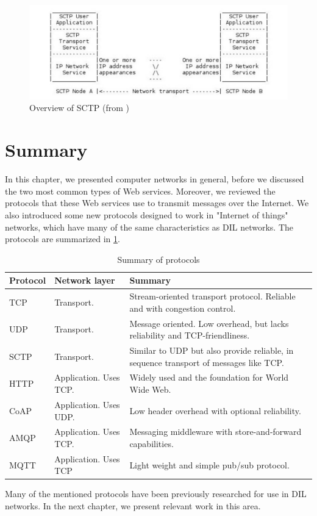 \begin{figure}[h]
\includegraphics[scale=0.5]{images/sctp.pdf}
\caption{Overview of SCTP (from \cite{rfc-sctp})}
\end{figure}



\section{Summary}

In this chapter, we presented computer networks in general, before we discussed
the two most common types of Web services. Moreover, we reviewed the protocols
that these Web services use to transmit messages over the Internet. We also
introduced some new protocols designed to work in "Internet of things" networks,
which have many of the same characteristics as DIL networks. The protocols are
summarized in \cref{table:protocols:summary}.

\begin{table}[h]
\begin{tabularx}{\textwidth}{| l | l | X |}
\hline
  \textbf{Protocol} & \textbf{Network layer} & \textbf{Summary} \\ \hline
  TCP & Transport. & Stream-oriented transport protocol. Reliable and with congestion control. \\ \hline
  UDP & Transport. & Message oriented. Low overhead, but lacks reliability and TCP-friendliness. \\ \hline
  SCTP & Transport. & Similar to UDP but also provide reliable, in sequence transport of messages like TCP. \\ \hline
  HTTP & Application. Uses TCP. &  Widely used and the foundation for World Wide Web. \\ \hline
  CoAP & Application. Uses UDP. & Low header overhead with optional reliability. \\ \hline
  AMQP & Application. Uses TCP. &  Messaging middleware with store-and-forward capabilities.\\ \hline
  MQTT & Application. Uses TCP & Light weight and simple pub/sub protocol. \\ \hline
\end{tabularx}
\caption{Summary of protocols}
\label{table:protocols:summary}
\end{table}

Many of the mentioned protocols have been previously researched for use in DIL
networks. In the next chapter, we present relevant work in this area.
